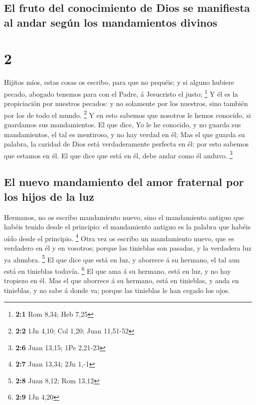 \hypertarget{el-fruto-del-conocimiento-de-dios-se-manifiesta-al-andar-seguxfan-los-mandamientos-divinos}{%
\subsection{El fruto del conocimiento de Dios se manifiesta al andar
según los mandamientos
divinos}\label{el-fruto-del-conocimiento-de-dios-se-manifiesta-al-andar-seguxfan-los-mandamientos-divinos}}

\hypertarget{section-1}{%
\section{2}\label{section-1}}

 Hijitos míos, estas cosas os escribo, para que no
pequéis; y si alguno hubiere pecado, abogado tenemos para con el Padre,
á Jesucristo el justo; \footnote{\textbf{2:1} Rom 8,34; Heb 7,25}
 Y él es la propiciación por nuestros pecados: y no
solamente por los nuestros, sino también por los de todo el mundo.
\footnote{\textbf{2:2} 1Jn 4,10; Col 1,20; Juan 11,51-52} 
Y en esto sabemos que nosotros le hemos conocido, si guardamos sus
mandamientos.  El que dice, Yo le he conocido, y no guarda
sus mandamientos, el tal es mentiroso, y no hay verdad en él;
 Mas el que guarda su palabra, la caridad de Dios está
verdaderamente perfecta en él: por esto sabemos que estamos en él.
 El que dice que está en él, debe andar como él anduvo.
\footnote{\textbf{2:6} Juan 13,15; 1Pe 2,21-23}

\hypertarget{el-nuevo-mandamiento-del-amor-fraternal-por-los-hijos-de-la-luz}{%
\subsection{El nuevo mandamiento del amor fraternal por los hijos de la
luz}\label{el-nuevo-mandamiento-del-amor-fraternal-por-los-hijos-de-la-luz}}

 Hermanos, no os escribo mandamiento nuevo, sino el
mandamiento antiguo que habéis tenido desde el principio: el mandamiento
antiguo es la palabra que habéis oído desde el principio. \footnote{\textbf{2:7}
  Juan 13,34; 2Jn 1,-1}  Otra vez os escribo un
mandamiento nuevo, que es verdadero en él y en vosotros; porque las
tinieblas son pasadas, y la verdadera luz ya alumbra. \footnote{\textbf{2:8}
  Juan 8,12; Rom 13,12}  El que dice que está en luz, y
aborrece á su hermano, el tal aun está en tinieblas todavía. \footnote{\textbf{2:9}
  1Jn 4,20}  El que ama á su hermano, está en luz, y no
hay tropiezo en él.  Mas el que aborrece á su hermano,
está en tinieblas, y anda en tinieblas, y no sabe á donde va; porque las
tinieblas le han cegado los ojos.

